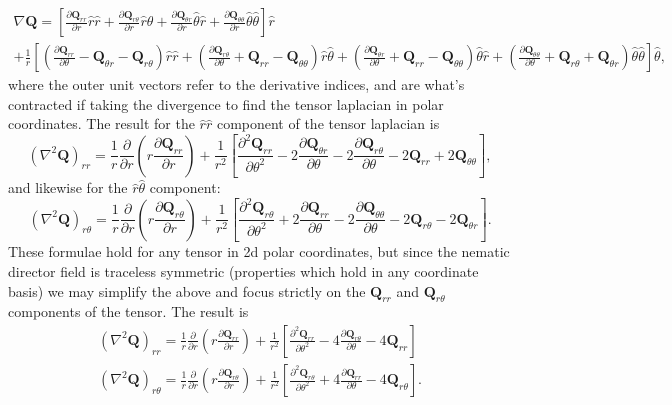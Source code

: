 \documentclass[onecolumn,showpacs,preprintnumbers,prl,amsmath,amssymb]{revtex4-1}
\def\b{\mathbf}
\begin{document}
\begin{gather}
\nabla \b{Q}=\left[ \frac{\partial\b{Q}_{rr}}{\partial r}\hat{r}\hat{r}+\frac{\partial\b{Q}_{r\theta}}{\partial r}\hat{r}\hat{\theta}+\frac{\partial\b{Q}_{\theta r}}{\partial r}\hat{\theta}\hat{r}+\frac{\partial\b{Q}_{\theta\theta}}{\partial r}\hat{\theta}\hat{\theta} \right]\hat{r}\\
\nonumber+\frac{1}{r}\left[ (\frac{\partial\b{Q}_{rr}}{\partial \theta}-\b{Q}_{\theta r}-\b{Q}_{r \theta })\hat{r}\hat{r}+(\frac{\partial\b{Q}_{r\theta}}{\partial \theta}+\b{Q}_{rr}-\b{Q}_{\theta \theta})\hat{r}\hat{\theta}+(\frac{\partial\b{Q}_{\theta r}}{\partial \theta}+\b{Q}_{rr}-\b{Q}_{\theta \theta})\hat{\theta}\hat{r}+(\frac{\partial\b{Q}_{\theta \theta}}{\partial \theta}+\b{Q}_{r\theta}+\b{Q}_{\theta r})\hat{\theta}\hat{\theta}  \right]\hat{\theta},
\end{gather}
where the outer unit vectors refer to the derivative indices, and are what's contracted if taking the divergence to find the tensor laplacian in polar coordinates.  The result for the $\hat{r}\hat{r}$ component of the tensor laplacian is
\begin{equation}
(\nabla^2 \b{Q})_{rr}=\frac{1}{r}\frac{\partial}{\partial r}\left(r\frac{\partial\b{Q}_{rr}}{\partial r}\right)+\frac{1}{r^2}\left[\frac{\partial^2\b{Q}_{rr}}{\partial\theta^2}-2\frac{\partial\b{Q}_{\theta r}}{\partial \theta}-2\frac{\partial\b{Q}_{r\theta }}{\partial \theta}-2\b{Q}_{rr}+2\b{Q}_{\theta\theta}\right],
\end{equation}
and likewise for the $\hat{r}\hat{\theta}$ component:
\begin{equation}
(\nabla^2 \b{Q})_{r\theta}=\frac{1}{r}\frac{\partial}{\partial r}\left(r\frac{\partial\b{Q}_{r\theta}}{\partial r}\right)+\frac{1}{r^2}\left[\frac{\partial^2\b{Q}_{r\theta}}{\partial\theta^2}+2\frac{\partial\b{Q}_{r r}}{\partial \theta}-2\frac{\partial\b{Q}_{\theta \theta }}{\partial \theta}-2\b{Q}_{r\theta}-2\b{Q}_{\theta r}\right].
\end{equation}
These formulae hold for any tensor in 2d polar coordinates, but since the nematic director field is traceless symmetric (properties which hold in any coordinate basis) we may simplify the above and focus strictly on the $\b{Q}_{rr}$ and $\b{Q}_{r\theta}$ components of the tensor.  The result is
\begin{gather}
(\nabla^2 \b{Q})_{rr}=\frac{1}{r}\frac{\partial}{\partial r}\left(r\frac{\partial\b{Q}_{rr}}{\partial r}\right)+\frac{1}{r^2}\left[\frac{\partial^2\b{Q}_{rr}}{\partial\theta^2}-4\frac{\partial\b{Q}_{ r\theta}}{\partial \theta}-4\b{Q}_{rr}\right]\\
\nonumber (\nabla^2 \b{Q})_{r\theta}=\frac{1}{r}\frac{\partial}{\partial r}\left(r\frac{\partial\b{Q}_{r\theta}}{\partial r}\right)+\frac{1}{r^2}\left[\frac{\partial^2\b{Q}_{r\theta}}{\partial\theta^2}+4\frac{\partial\b{Q}_{r r}}{\partial \theta}-4\b{Q}_{r\theta}\right].
\end{gather}
\end{document}
